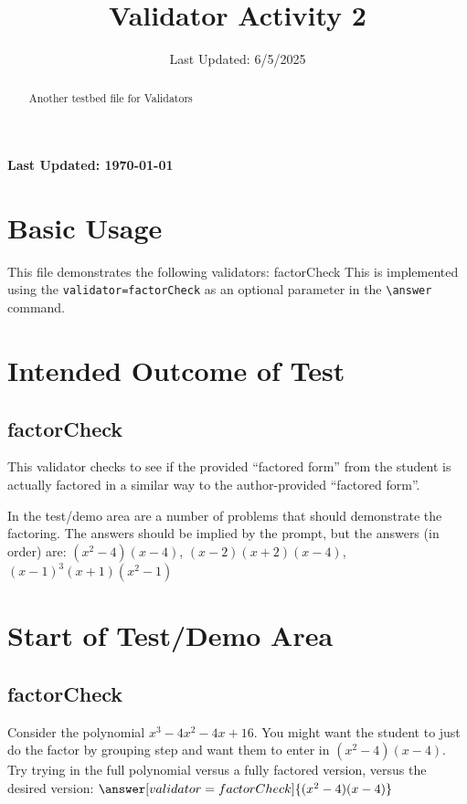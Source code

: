 \documentclass{ximera}
\title{Validator Activity 2}
\date{Last Updated: 6/5/2025}
\begin{document}
\begin{abstract}
    Another testbed file for Validators
\end{abstract}
\maketitle

{{\Huge \bfseries Last Updated: \today}} \\

\section{Basic Usage}

This file demonstrates the following validators: factorCheck
This is implemented using the \verb|validator=factorCheck| as an optional parameter in the \verb|\answer| command.

\section{Intended Outcome of Test}
    \subsection*{factorCheck}
        This validator checks to see if the provided ``factored form'' from the student 
        is actually factored in a similar way to the author-provided ``factored form''.
        
        In the test/demo area are a number of problems that should demonstrate the factoring. The answers should be implied by the prompt, 
        but the answers (in order) are: $(x^2-4)(x-4)$, $(x-2)(x+2)(x-4)$, $(x-1)^3(x+1)(x^2-1)$

\section{Start of Test/Demo Area}

    \subsection*{factorCheck}
        \begin{problem}
            Consider the polynomial $x^3 - 4x^2 - 4x + 16$. You might want the student to just do the factor by grouping step 
            and want them to enter in $(x^2-4)(x-4)$. 
            Try trying in the full polynomial versus a fully factored version, 
            versus the desired version: $\answer[validator=factorCheck]{(x^2-4)(x-4)}$
        \end{problem}
\end{document}

